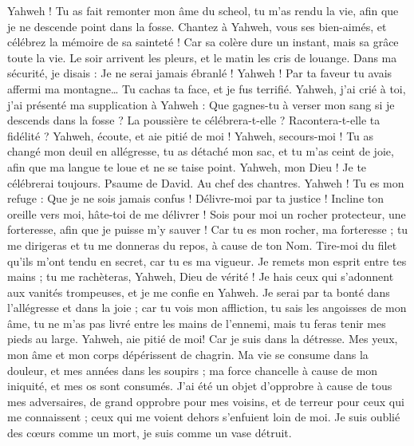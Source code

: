 \begin{multicols}{2}
Yahweh ! Tu as fait remonter mon âme du scheol, tu m'as rendu la vie, afin que je ne descende point dans la fosse.
Chantez à Yahweh, vous ses bien-aimés, et célébrez la mémoire de sa sainteté !
Car sa colère dure un instant, mais sa grâce toute la vie. Le soir arrivent les pleurs, et le matin les cris de louange.
Dans ma sécurité, je disais : Je ne serai jamais ébranlé !
Yahweh ! Par ta faveur tu avais affermi ma montagne… Tu cachas ta face, et je fus terrifié.
Yahweh, j'ai crié à toi, j'ai présenté ma supplication à Yahweh :
Que gagnes-tu à verser mon sang si je descends dans la fosse ? La poussière te célébrera-t-elle ? Racontera-t-elle ta fidélité ?
Yahweh, écoute, et aie pitié de moi ! Yahweh, secours-moi !
Tu as changé mon deuil en allégresse, tu as détaché mon sac, et tu m'as ceint de joie,
afin que ma langue te loue et ne se taise point. Yahweh, mon Dieu ! Je te célébrerai toujours.
\VerseOne{}Psaume de David. Au chef des chantres.
Yahweh ! Tu es mon refuge : Que je ne sois jamais confus ! Délivre-moi par ta justice !
Incline ton oreille vers moi, hâte-toi de me délivrer ! Sois pour moi un rocher protecteur, une forteresse, afin que je puisse m'y sauver !
Car tu es mon rocher, ma forteresse ; tu me dirigeras et tu me donneras du repos, à cause de ton Nom.
Tire-moi du filet qu'ils m'ont tendu en secret, car tu es ma vigueur.
Je remets mon esprit entre tes mains ; tu me rachèteras, Yahweh, Dieu de vérité !
Je hais ceux qui s'adonnent aux vanités trompeuses, et je me confie en Yahweh.
Je serai par ta bonté dans l'allégresse et dans la joie ; car tu vois mon affliction, tu sais les angoisses de mon âme,
tu ne m'as pas livré entre les mains de l'ennemi, mais tu feras tenir mes pieds au large.
Yahweh, aie pitié de moi! Car je suis dans la détresse. Mes yeux, mon âme et mon corps dépérissent de chagrin.
Ma vie se consume dans la douleur, et mes années dans les soupirs ; ma force chancelle à cause de mon iniquité, et mes os sont consumés.
J'ai été un objet d'opprobre à cause de tous mes adversaires, de grand opprobre pour mes voisins, et de terreur pour ceux qui me connaissent ; ceux qui me voient dehors s'enfuient loin de moi.
Je suis oublié des cœurs comme un mort, je suis comme un vase détruit.

\end{multicols}
